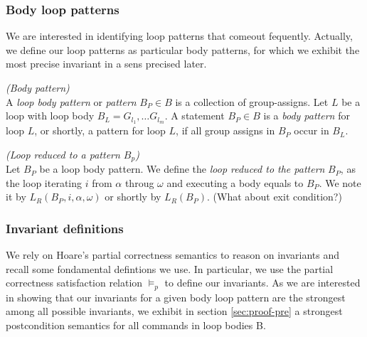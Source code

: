 \documentclass[a4paper,10pt]{article}
\newcommand{\idx}{\ensuremath{i}\xspace}
\newcommand{\idxinitial}{\ensuremath{\alpha}\xspace}
\newcommand{\idxfinal}{\ensuremath{\omega}\xspace}
\newcommand{\SB}{\ensuremath{\mathit{B}}}
\newenvironment{definition}[1][Definition]{\begin{trivlist}
\item[\hskip \labelsep {\bfseries #1}]}{\end{trivlist}}
\begin{document}
\subsubsection*{Body loop patterns}

We are interested in identifying  loop patterns that comeout  fequently. 
Actually, we define our loop patterns as particular body patterns, 
for which we exhibit the most precise invariant in a sens precised later.

\begin{definition} \emph{(Body pattern)}\\
A \textit{loop body pattern} or \textit{pattern} $B_P \in \SB$ is a collection of group-assigns.
Let $L$ be a loop with loop body $B_L = G_{l_1}, \ldots G_{l_m}$. 
A statement $B_P \in \SB$ is a \textit{body pattern} for loop $L$, or shortly, 
a pattern for loop $L$, if all group assigns in $B_P$ occur in $B_L$.
\end{definition}

\begin{definition} \emph{(Loop reduced to a pattern $B_p$)}\\
Let $B_P$ be a loop body pattern. We define the \textit{loop reduced to the pattern} $B_P$, 
as the loop  iterating \idx from $\idxinitial$ throug $\idxfinal$ and executing a body equals to $B_P$.
We note it by $L_R(B_P, i, \idxinitial,\idxfinal)$ or shortly by $L_R(B_P)$. (What about exit condition?)
\end{definition}
\subsubsection*{Invariant definitions}

We rely on Hoare's partial correctness semantics to reason on invariants and recall
some fondamental defintions we use. In particular, we use the partial correctness 
satisfaction relation $\vDash_{p}$ to define our invariants.
As we are interested in showing that our invariants for a given body loop pattern are 
the strongest among all possible invariants, we exhibit in section \ref{sec:proof-pre} 
a strongest postcondition semantics for all commands in loop bodies {B}.
\end{document}

